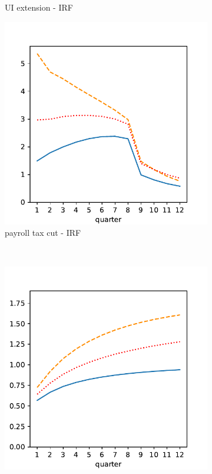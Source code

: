 \begin{figure}[htb]
\begin{subfigure}[b]{.33\linewidth}
		\caption{UI extension - IRF}
		\label{fig:hank_UI_irf}
	\end{subfigure}%
	\begin{subfigure}[b]{.33\linewidth}
		\centering
		\includegraphics[width=\linewidth]{text/chapter3/Code/HA-Models/FromPandemicCode/Figures/HANK_tax_irf}
		\caption{payroll tax cut - IRF}
		\label{fig:hank_tax_irf}
	\end{subfigure}\\
	\begin{subfigure}[b]{.33\linewidth}
		\centering
		\includegraphics[width=\linewidth]{text/chapter3/Code/HA-Models/FromPandemicCode/Figures/HANK_transfer_multiplier}

\end{subfigure}
\end{figure}
